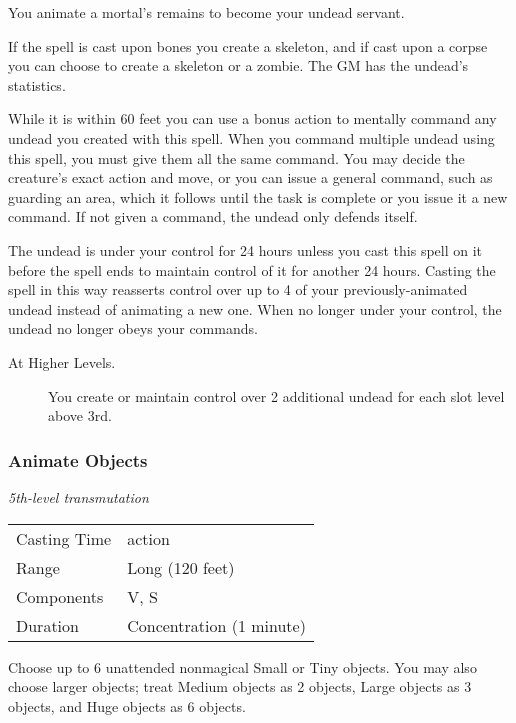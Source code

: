 You animate a mortal's remains to become your undead servant.

If the spell is cast upon bones you create a skeleton, and if cast upon
a corpse you can choose to create a skeleton or a zombie. The GM has the
undead's statistics.

While it is within 60 feet you can use a bonus action to mentally
command any undead you created with this spell. When you command
multiple undead using this spell, you must give them all the same
command. You may decide the creature's exact action and move, or you can
issue a general command, such as guarding an area, which it follows
until the task is complete or you issue it a new command. If not given a
command, the undead only defends itself.

The undead is under your control for 24 hours unless you cast this spell
on it before the spell ends to maintain control of it for another 24
hours. Casting the spell in this way reasserts control over up to 4 of
your previously-animated undead instead of animating a new one. When no
longer under your control, the undead no longer obeys your commands.

\begin{description}
\item[At Higher Levels.]
You create or maintain control over 2 additional undead for each slot
level above 3rd.
\end{description}

\subsubsection{Animate Objects}\label{spell-animate-objects}

\emph{5th-level transmutation}

\begin{longtable}[]{@{}
  >{\raggedright\arraybackslash}p{}
  >{\raggedright\arraybackslash}p{}@{}}
\toprule\noalign{}
\endhead
\bottomrule\noalign{}
\endlastfoot
Casting Time & 1 action \\
Range & Long (120 feet) \\
Components & V, S \\
Duration & Concentration (1 minute) \\
\end{longtable}

Choose up to 6 unattended nonmagical Small or Tiny objects. You may also
choose larger objects; treat Medium objects as 2 objects, Large objects
as 3 objects, and Huge objects as 6 objects.

